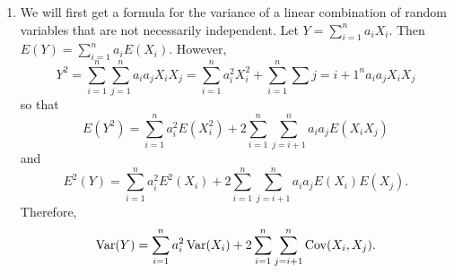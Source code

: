 \documentclass{article}
\begin{document}
\begin{enumerate}
\item We will first get a formula for the variance of a linear combination of
random variables that are not necessarily independent. Let $Y = \sum_{i=1}^na_i
X_i$. Then $E(Y) = \sum_{i=1}^na_iE(X_i)$. However,
\[
Y^2 = \sum_{i=1}^n\sum_{j=1}^n a_ia_jX_iX_j = \sum_{i=1}^na_i^2X_i^2 + 
\sum_{i=1}^n\sum{j=i+1}^na_ia_j X_iX_j
\]
so that
\begin{equation}\label{e3}
E(Y^2) = \sum_{i=1}^na_i^2E(X_i^2) + 2\sum_{i=1}^n\sum_{j=i+1}^na_ia_jE(X_iX_j)
\end{equation}
and 
\begin{equation}\label{e4}
E^2(Y) = \sum_{i=1}^n a_i^2E^2(X_i) + 
2\sum_{i=1}^n\sum_{j=i+1}^n a_ia_jE(X_i)E(X_j).
\end{equation}
Therefore,
\begin{equation}\label{e5}
\operatorname{Var}(Y) = \sum_{i=1}^na_i^2\operatorname{Var}(X_i) + 2\sum_{i=1}^n\sum_{j=i+1}^n\operatorname{Cov}(X_i,X_j).
\end{equation}


\end{enumerate}
\end{document}
